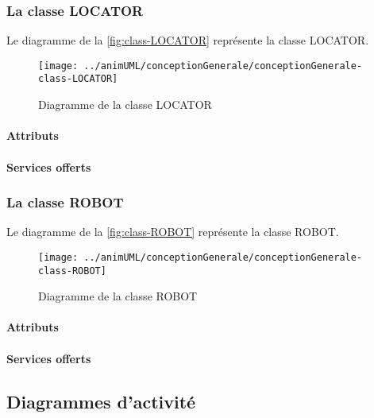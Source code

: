 \subsubsection{La classe LOCATOR}

Le diagramme de la \autoref{fig:class-LOCATOR} représente la classe LOCATOR.
\begin{figure}[H]
	\centering
	\texttt{[image: ../animUML/conceptionGenerale/conceptionGenerale-class-LOCATOR]}
	\caption{Diagramme de la classe LOCATOR}
	\label{fig:class-LOCATOR}
\end{figure}


\paragraph{Attributs}
\classLOCATORProperties
\paragraph{Services offerts}
\classLOCATOROperations
\subsubsection{La classe ROBOT}

Le diagramme de la \autoref{fig:class-ROBOT} représente la classe ROBOT.
\begin{figure}[H]
	\centering
	\texttt{[image: ../animUML/conceptionGenerale/conceptionGenerale-class-ROBOT]}
	\caption{Diagramme de la classe ROBOT}
	\label{fig:class-ROBOT}
\end{figure}


\paragraph{Attributs}
\classROBOTProperties
\paragraph{Services offerts}
\classROBOTOperations

\subsection{Diagrammes d'activité}


